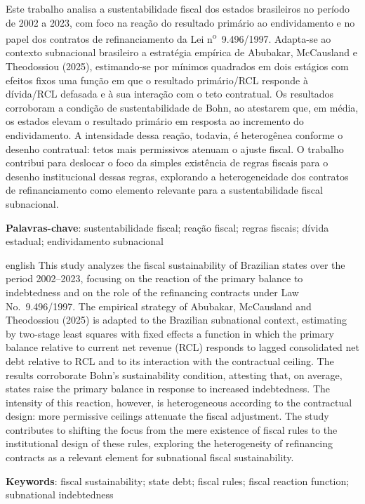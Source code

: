 \begin{resumo}
Este trabalho analisa a sustentabilidade fiscal dos estados brasileiros no período de 2002 a 2023, com foco na reação do resultado primário ao endividamento e no papel dos contratos de refinanciamento da Lei n\textsuperscript{o}~9.496/1997. Adapta-se ao contexto subnacional brasileiro a estratégia empírica de Abubakar, McCausland e Theodossiou (2025), estimando-se por mínimos quadrados em dois estágios com efeitos fixos uma função em que o resultado primário/RCL responde à dívida/RCL defasada e à sua interação com o teto contratual. Os resultados corroboram a condição de sustentabilidade de Bohn, ao atestarem que, em média, os estados elevam o resultado primário em resposta ao incremento do endividamento. A intensidade dessa reação, todavia, é heterogênea conforme o desenho contratual: tetos mais permissivos atenuam o ajuste fiscal. O trabalho contribui para deslocar o foco da simples existência de regras fiscais para o desenho institucional dessas regras, explorando a heterogeneidade dos contratos de refinanciamento como elemento relevante para a sustentabilidade fiscal subnacional.
\vspace{\onelineskip}

\noindent
\textbf{Palavras-chave}: sustentabilidade fiscal; reação fiscal; regras fiscais; dívida estadual; endividamento subnacional\end{resumo}

\begin{resumo}[Abstract]
\begin{otherlanguage*}{english}
This study analyzes the fiscal sustainability of Brazilian states over the period 2002--2023, focusing on the reaction of the primary balance to indebtedness and on the role of the refinancing contracts under Law No.~9.496/1997. The empirical strategy of Abubakar, McCausland and Theodossiou (2025) is adapted to the Brazilian subnational context, estimating by two-stage least squares with fixed effects a function in which the primary balance relative to current net revenue (RCL) responds to lagged consolidated net debt relative to RCL and to its interaction with the contractual ceiling. The results corroborate Bohn's sustainability condition, attesting that, on average, states raise the primary balance in response to increased indebtedness. The intensity of this reaction, however, is heterogeneous according to the contractual design: more permissive ceilings attenuate the fiscal adjustment. The study contributes to shifting the focus from the mere existence of fiscal rules to the institutional design of these rules, exploring the heterogeneity of refinancing contracts as a relevant element for subnational fiscal sustainability.
\vspace{\onelineskip}

\noindent
\textbf{Keywords}: fiscal sustainability; state debt; fiscal rules; fiscal reaction function; subnational indebtedness\end{otherlanguage*}
\end{resumo}